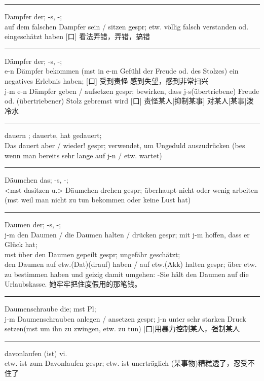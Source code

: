 \noindent\rule{\textwidth}{1pt}
Dampfer der; -s, -; \\
auf dem falschen Dampfer sein / sitzen gespr; etw. v\"ollig falsch verstanden od. eingesch\"atzt haben [口] 看法弄错，弄错，搞错 \\

\noindent\rule{\textwidth}{1pt}
D\"ampfer der; -s, -; \\
e-n D\"ampfer bekommen (mst in e-m Gef\"uhl der Freude od. des Stolzes) ein negatives Erlebnis haben; [口] 受到责怪 感到失望，感到非常扫兴\\
j-m e-n D\"ampfer geben / aufsetzen gespr; bewirken, dass j-s(\"ubertriebene) Freude od. (\"ubertriebener) Stolz gebremst wird [口] 责怪某人[抑制某事] 对某人[某事]泼冷水\\

\noindent\rule{\textwidth}{1pt}
dauern ; dauerte, hat gedauert; \\
Das dauert aber / wieder! gespr; verwendet, um Ungeduld auszudr\"ucken (bes wenn man bereits sehr lange auf j-n / etw. wartet) \\

\noindent\rule{\textwidth}{1pt}
D\"aumchen das; -s, -; \\
<mst dasitzen u.> D\"aumchen drehen gespr; \"uberhaupt nicht oder wenig arbeiten (mst weil man nicht zu tun bekommen oder keine Lust hat) \\

\noindent\rule{\textwidth}{1pt}
Daumen der; -s, -; \\
j-m den Daumen / die Daumen halten / dr\"ucken gespr; mit j-m hoffen, dass er Gl\"uck hat; \\
mst \"uber den Daumen gepeilt gespr; ungef\"ahr gesch\"atzt; \\
den Daumen auf etw.(Dat)(drauf) haben / auf etw.(Akk) halten gespr; \"uber etw. zu bestimmen haben und geizig damit umgehen: -Sie h\"alt den Daumen auf die Urlaubskasse. 她牢牢把住度假用的那笔钱。\\

\noindent\rule{\textwidth}{1pt}
Daumenschraube die; mst Pl; \\
j-m Daumenschrauben anlegen / ansetzen gespr; j-n unter sehr starken Druck setzen(mst um ihn zu zwingen, etw. zu tun) [口]用暴力控制某人，强制某人\\

\noindent\rule{\textwidth}{1pt}
davonlaufen (ist) vi. \\
etw. ist zum Davonlaufen gespr; etw. ist unertr\"aglich (某事物)糟糕透了，忍受不住了 \\

